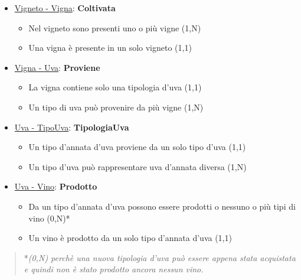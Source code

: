 \begin{itemize}
	\item \underline{Vigneto - Vigna}: \textbf{Coltivata}
	
	\begin{itemize}
		\item Nel vigneto sono presenti uno o più vigne (1,N)
		\item Una vigna è presente in un solo vigneto (1,1)
	\end{itemize}
	
\end{itemize}

\begin{itemize}
	\item \underline{Vigna - Uva}: \textbf{Proviene}
	
	\begin{itemize}
		\item La vigna contiene solo una tipologia d'uva (1,1)
		\item Un tipo di uva può provenire da più vigne (1,N)
	\end{itemize}
	
\end{itemize}

\begin{itemize}
	\item \underline{Uva - TipoUva}: \textbf{TipologiaUva}
	
	\begin{itemize}
		\item Un tipo d'annata d'uva proviene da un solo tipo d'uva (1,1)
		\item Un tipo d'uva può rappresentare uva d'annata diversa (1,N)
	\end{itemize}
	
\end{itemize}

\begin{itemize}
	\item \underline{Uva - Vino}: \textbf{Prodotto}
	
	\begin{itemize}
		\item Da un tipo d'annata d'uva possono essere prodotti o nessuno o più tipi di vino (0,N)*
		\item Un vino è prodotto da un solo tipo d'annata d'uva (1,1)
	\end{itemize}
	
\end{itemize}

\begin{verse}
	*\emph{(0,N) perchè una nuova tipologia d'uva può essere appena stata acquistata e quindi non è stato prodotto ancora nessun vino.}
\end{verse}


